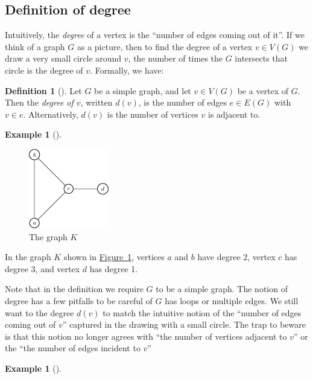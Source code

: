 \documentclass[10pt,]{book}
\theoremstyle{plain}
\theoremstyle{definition}
\newtheorem{definition}[theorem]{Definition}
\theoremstyle{definition}
\theoremstyle{definition}
\newtheorem{example}[theorem]{Example}
\theoremstyle{definition}
\numberwithin{equation}{section}
\begin{document}
\subsection[{Definition of degree}]{Definition of degree}\label{subsection-4}
\hypertarget{p-18}{}%
Intuitively, the \emph{degree} of a vertex is the ``number of edges coming out of it''. If we think of a graph \(G\) as a picture, then to find the degree of a vertex \(v\in V(G)\) we draw a very small circle around \(v\), the number of times the \(G\) intersects that circle is the degree of \(v\).  Formally, we have:%
\begin{definition}[{}]\label{definition-6}
\hypertarget{p-19}{}%
Let \(G\) be a simple graph, and let \(v\in V(G)\) be a vertex of \(G\).  Then the \emph{degree of \(v\)}, written \(d(v)\), is the number of edges \(e\in E(G)\) with \(v\in e\). Alternatively, \(d(v)\) is the number of vertices \(v\) is adjacent to.%
\end{definition}
\begin{example}[]\label{example-3}
\leavevmode%
\begin{figure}
\centering
\includegraphics[width=0.5\linewidth]{images/degreeexamplegraph.png}
\caption{The graph \(K\)\label{fig_trumpet_graph}}
\end{figure}
\hypertarget{p-20}{}%
In the graph \(K\) shown in \hyperref[fig_trumpet_graph]{Figure~\ref{fig_trumpet_graph}}, vertices \(a\) and \(b\) have degree 2, vertex \(c\) has degree 3, and vertex \(d\) has degree 1.%
\end{example}
\hypertarget{p-21}{}%
Note that in the definition we require \(G\) to be a simple graph.  The notion of degree has a few pitfalls to be careful of \(G\) has loops or multiple edges.  We still want to the degree \(d(v)\) to match the intuitive notion of the ``number of edges coming out of \(v\)'' captured in the drawing with a small circle.  The trap to beware is that this notion no longer agrees with ``the number of vertices adjacent to \(v\)'' or the ``the number of edges incident to \(v\)''%
\begin{example}[]\label{example-4}
\end{example}
\typeout{************************************************}
\typeout{************************************************}
\end{document}
